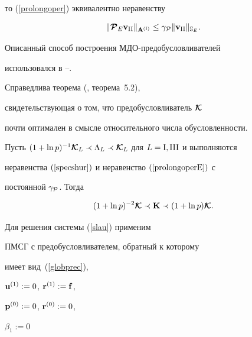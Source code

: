 то (\ref{prolongoper}) эквивалентно неравенству


\begin{equation}\label{prolongoperE}


\| {\bc P}_E {\bold v}_{\rii} \|_{{\bold


A}^{(\ri)}} \le \gamma_{\cal P} \| {\bold v}_{\rii} \|_{\Bbb S_E}.


\end{equation}





Описанный способ построения МДО-предобусловливателей


использовался в \cite{KI1996}--\cite{KJ1999a}.


Справедлива теорема (\cite{KJ1999a}, теорема~5.2),


свидетельствующая о том, что предобусловливатель ${\boldsymbol{\cal {K}}}$


почти оптимален в смысле относительного числа обусловленности.





\begin{thms}\label{TeorGlobPrec}


Пусть $(1+\ln p)^{-1}{\bc K}_L \prec


\Lambda_L \prec {\bc K}_L $ для $L=\ri,\riii$ и выполняются


неравенства $(\ref{specshur})$ и неравенство $(\ref{prolongoperE})$ с


постоянной $\gamma_{\cal P}$.  Тогда


$$


(1+\ln p)^{-2}\bi{\cal K} \prec {\bold K} \prec (1+\ln p) \bi{\cal K}.


$$


\end{thms}





Для решения системы (\ref{slau}) применим 


ПМСГ с предобусловливателем, обратный к которому


имеет вид~(\ref{globprec}),





${\bold u}^{(1)} := 0$, ${\bold r}^{(1)} := {\bold f}$,


${\bold p}^{(0)} := 0$, ${\bold r}^{(0)} := 0$,


${\beta}_1 := 0$





